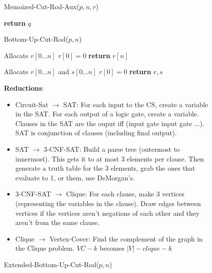 \documentclass[7pt]{article}
\begin{document}
\begin{figure*}[ttt!]
\begin{minipage}[t]{.25\linewidth}
    \begin{algorithm}[H]
    \caption{Memoized-Cut-Rod-Aux($p,n,r$)}
    {\bf return} $q$ \;
    \end{algorithm}

    \begin{algorithm}[H]
    \caption{Bottom-Up-Cut-Rod($p,n$)}
        Allocate $r[0\ldots n]$ \;
        $r[0]=0$ \;
    {\bf return} $r[n]$ \;
    \end{algorithm}
  \end{minipage}
  \begin{minipage}[t]{.25\linewidth}
    \vspace{0pt}

    \begin{algorithm}[H]
    \caption{Extended-Bottom-Up-Cut-Rod($p,n$)}
        Allocate $r[0\ldots n]$ and $s[0\ldots n]$ \;
        $r[0]=0$ \;
    {\bf return} $r,s$ \;
    \end{algorithm}
    
    {\bf Reductions}:
    \begin{itemize}
    \item Circuit-Sat $\rightarrow$ SAT: For each input to the CS, create a
      variable in the SAT.  For each output of a logic gate, create a
      variable.  Clauses in the SAT are the ouput iff (input gate
      input gate ...). SAT is conjunction of clauses (including final
      output).     
    \item SAT $\rightarrow$ 3-CNF-SAT: Build a parse tree (outermost
      to innermost).  This gets it to at most 3 elements per clause.
      Then generate a truth table for the 3 elements, grab the ones
      that evaluate to 1, or them, use DeMorgan's.  
    \item 3-CNF-SAT $\rightarrow$ Clique: For each clause, make 3
      vertices (representing the variables in the clause).  Draw edges
      between vertices if the vertices aren't negations of each other
      and they aren't from the same clause.
    \item Clique $\rightarrow$ Vertex-Cover: Find the complement of
      the graph in the Clique problem.  $VC-k$ becomes $|V| - clique-k$
    \end{itemize}
    

\end{minipage}
\end{figure*}
\end{document}
